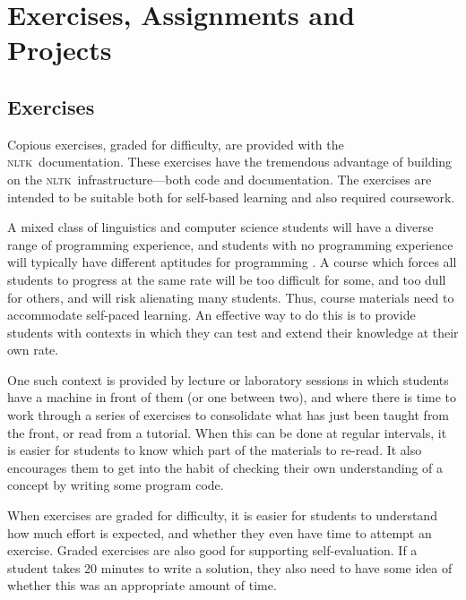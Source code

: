 \documentclass[11pt]{article}
\newcommand{\NLTK}{\textsc{nltk}}
\begin{document}
\section{Exercises, Assignments and Projects}
\label{sec:projects}

\subsection{Exercises}

Copious exercises, graded for difficulty, are provided with the \NLTK\ documentation. These
exercises have the tremendous advantage of building on the \NLTK\
infrastructure---both code and documentation. The exercises are
intended to be suitable both for self-based learning and also
required coursework.

A mixed class of linguistics and computer science students will have a
diverse range of programming experience, and students with no
programming experience will typically have different aptitudes for
programming \cite{Caspersen07}.  A course which forces all students to
progress at the same rate will be too difficult for some, and too dull
for others, and will risk alienating many students.  Thus, course
materials need to accommodate self-paced learning.  An effective way
to do this is to provide students with contexts in which they can test
and extend their knowledge at their own rate.

One such context is provided by lecture or laboratory sessions in
which students have a machine in front of them (or one between two),
and where there is time to work through a series of exercises to
consolidate what has just been taught from the front, or read from a
tutorial. When this can be done at regular intervals, it is easier for
students to know which part of the materials to re-read.  It also
encourages them to get into the habit of checking their own
understanding of a concept by writing some program code.

When exercises are graded for difficulty, it is easier for students to
understand how much effort is expected, and whether they even have
time to attempt an exercise.  Graded exercises are also good for
supporting self-evaluation.  If a student takes 20 minutes to write a
solution, they also need to have some idea of whether this was an
appropriate amount of time.

\end{document}
